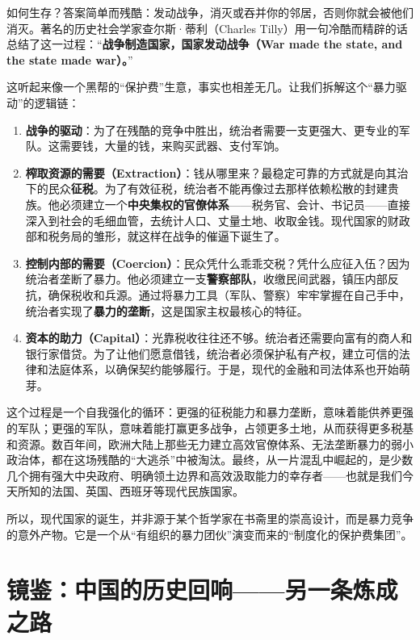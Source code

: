 \documentclass[a5paper, 11pt, openany]{ctexbook}
\begin{document}
如何生存？答案简单而残酷：发动战争，消灭或吞并你的邻居，否则你就会被他们消灭。著名的历史社会学家查尔斯·蒂利（Charles Tilly）用一句冷酷而精辟的话总结了这一过程：“\textbf{战争制造国家，国家发动战争（War made the state, and the state made war）。}”

这听起来像一个黑帮的“保护费”生意，事实也相差无几。让我们拆解这个“暴力驱动”的逻辑链：

\begin{enumerate}
    \item \textbf{战争的驱动}：为了在残酷的竞争中胜出，统治者需要一支更强大、更专业的军队。这需要钱，大量的钱，来购买武器、支付军饷。
    \item \textbf{榨取资源的需要（Extraction）}：钱从哪里来？最稳定可靠的方式就是向其治下的民众\textbf{征税}。为了有效征税，统治者不能再像过去那样依赖松散的封建贵族。他必须建立一个\textbf{中央集权的官僚体系}——税务官、会计、书记员——直接深入到社会的毛细血管，去统计人口、丈量土地、收取金钱。现代国家的财政部和税务局的雏形，就这样在战争的催逼下诞生了。
    \item \textbf{控制内部的需要（Coercion）}：民众凭什么乖乖交税？凭什么应征入伍？因为统治者垄断了暴力。他必须建立一支\textbf{警察部队}，收缴民间武器，镇压内部反抗，确保税收和兵源。通过将暴力工具（军队、警察）牢牢掌握在自己手中，统治者实现了\textbf{暴力的垄断}，这是国家主权最核心的特征。
    \item \textbf{资本的助力（Capital）}：光靠税收往往还不够。统治者还需要向富有的商人和银行家借贷。为了让他们愿意借钱，统治者必须保护私有产权，建立可信的法律和法庭体系，以确保契约能够履行。于是，现代的金融和司法体系也开始萌芽。
\end{enumerate}

这个过程是一个自我强化的循环：更强的征税能力和暴力垄断，意味着能供养更强的军队；更强的军队，意味着能打赢更多战争，占领更多土地，从而获得更多税基和资源。数百年间，欧洲大陆上那些无力建立高效官僚体系、无法垄断暴力的弱小政治体，都在这场残酷的“大逃杀”中被淘汰。最终，从一片混乱中崛起的，是少数几个拥有强大中央政府、明确领土边界和高效汲取能力的幸存者——也就是我们今天所知的法国、英国、西班牙等现代民族国家。

所以，现代国家的诞生，并非源于某个哲学家在书斋里的崇高设计，而是暴力竞争的意外产物。它是一个从“有组织的暴力团伙”演变而来的“制度化的保护费集团”。

\section{镜鉴：中国的历史回响——另一条炼成之路}
\end{document}
